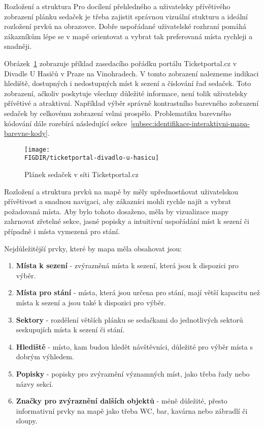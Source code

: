 \begin{subsection}{Rozložení a struktura}
    \label{subsec:identifikace-interaktivni-mapa-rozlozeni-a-struktura}
    Pro docílení přehledného a uživatelsky přívětivého zobrazení plánku sedaček je třeba zajistit správnou vizuální stukturu a ideální rozložení prvků na obrazovce.
    Dobře uspořádané uživatelské rozhraní pomáhá zákazníkům lépe se v mapě orientovat a vybrat tak preferovaná místa rychleji a snadněji.

    Obrázek~\ref{fig:venue-map-visualization-layout-and-structure} zobrazuje příklad zasedacího pořádku portálu Ticketportal.cz v Divadle U Hasičů v Praze na Vinohradech.
    V tomto zobrazení nalezneme indikaci hlediště, dostupných i nedostupných míst k sezení a číslování řad sedaček.
    Toto zobrazení, ačkoliv poskytuje všechny důležité informace, není tolik uživatelsky přívětivé a atraktivní.
    Například výběr správně kontrastního barevného zobrazení sedaček by celkovému zobrazení velmi prospělo.
    Problematiku barevného kódování dále rozebírá následující sekce~\ref{subsec:identifikace-interaktivni-mapa-barevne-kody}.

    \begin{figure}[H]
        \texttt{[image: \\FIGDIR/ticketportal-divadlo-u-hasicu]}
        \centering
        \caption{Plánek sedaček v síti Ticketportal.cz\cite{t__www_ticketportal_cz}}
        \label{fig:venue-map-visualization-layout-and-structure}
    \end{figure}

    Rozložení a struktura prvků na mapě by měly upřednostňovat uživatelskou přívětivost a snadnou navigaci, aby zákazníci mohli rychle najít a vybrat požadovaná místa.
    Aby bylo tohoto dosaženo, měla by vizualizace mapy zahrnovat zřetelné sekce, jasné popisky a intuitivní uspořádání míst k sezení či případně i místa vymezená pro stání.

    Nejdůležitější prvky, které by mapa měla obsahovat jsou:
    \begin{enumerate}
        \item \textbf{Místa k sezení} - zvýrazněná místa k sezení, která jsou k dispozici pro výběr.
        \item \textbf{Místa pro stání} - místa, která jsou určena pro stání, mají větší kapacitu než místa k sezení a jsou také k dispozici pro výběr.
        \item \textbf{Sektory} - rozdělení větších plánku se sedačkami do jednotlivých sektorů seskupujích místa k sezení či stání.
        \item \textbf{Hlediště} - místo, kam budou hledět návštěvníci, důležité pro výběr místa s dobrým výhledem.
        \item \textbf{Popisky} - popisky pro zvýraznění významných míst, jako třeba řady nebo názvy sekcí.
        \item \textbf{Značky pro zvýraznění dalších objektů} - méně důležité, přesto informativní prvky na mapě jako třeba WC, bar, kavárna nebo zábradlí či sloupy.
    \end{enumerate}


\end{subsection}
